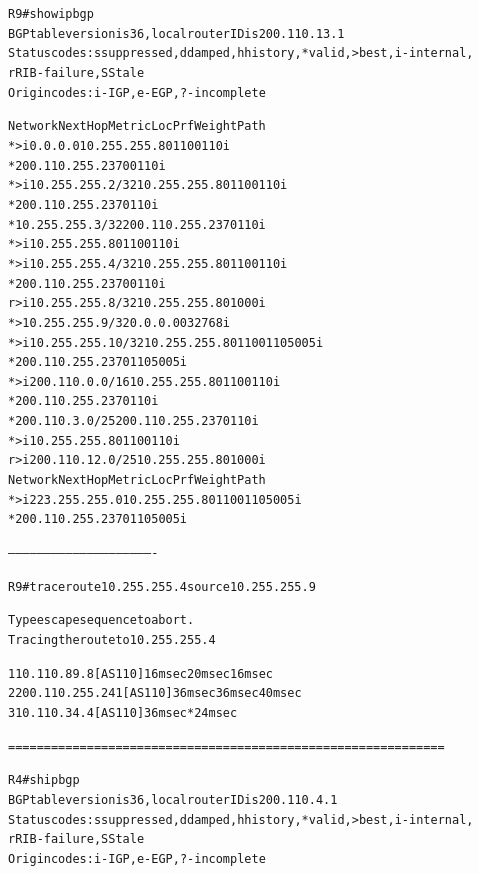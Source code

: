 \documentclass[12pt,twoside,a4paper]{report}
\begin{document}
\noindent
{\selectfont
\begin{small}
\begin{alltt}
R9# show ip bgp
BGP table version is 36, local router ID is 200.110.13.1
Status codes: s suppressed, d damped, h history, * valid, > best, i - internal,
              r RIB-failure, S Stale
Origin codes: i - IGP, e - EGP, ? - incomplete

   Network          Next Hop            Metric LocPrf Weight Path
*>i0.0.0.0          10.255.255.8             0    110      0 110 i
*                   200.110.255.237          0             0 110 i
*>i10.255.255.2/32  10.255.255.8             0    110      0 110 i
*                   200.110.255.237                        0 110 i
*  10.255.255.3/32  200.110.255.237                        0 110 i
*>i                 10.255.255.8             0    110      0 110 i
*>i10.255.255.4/32  10.255.255.8             0    110      0 110 i
*                   200.110.255.237          0             0 110 i
r>i10.255.255.8/32  10.255.255.8             0    100      0 i
*> 10.255.255.9/32  0.0.0.0                  0         32768 i
*>i10.255.255.10/32 10.255.255.8             0    110      0 110 5005 i
*                   200.110.255.237                        0 110 5005 i
*>i200.110.0.0/16   10.255.255.8             0    110      0 110 i
*                   200.110.255.237                        0 110 i
*  200.110.3.0/25   200.110.255.237                        0 110 i
*>i                 10.255.255.8             0    110      0 110 i
r>i200.110.12.0/25  10.255.255.8             0    100      0 i
   Network          Next Hop            Metric LocPrf Weight Path
*>i223.255.255.0    10.255.255.8             0    110      0 110 5005 i
*                   200.110.255.237                        0 110 5005 i


-------------------------------------------------------------


R9#traceroute 10.255.255.4 source 10.255.255.9

Type escape sequence to abort.
Tracing the route to 10.255.255.4

  1 10.110.89.8 [AS 110] 16 msec 20 msec 16 msec
  2 200.110.255.241 [AS 110] 36 msec 36 msec 40 msec
  3 10.110.34.4 [AS 110] 36 msec *  24 msec



=============================================================



R4#sh ip bgp
BGP table version is 36, local router ID is 200.110.4.1
Status codes: s suppressed, d damped, h history, * valid, > best, i - internal,
              r RIB-failure, S Stale
Origin codes: i - IGP, e - EGP, ? - incomplete


\end{alltt}
\end{small}}
\end{document}
